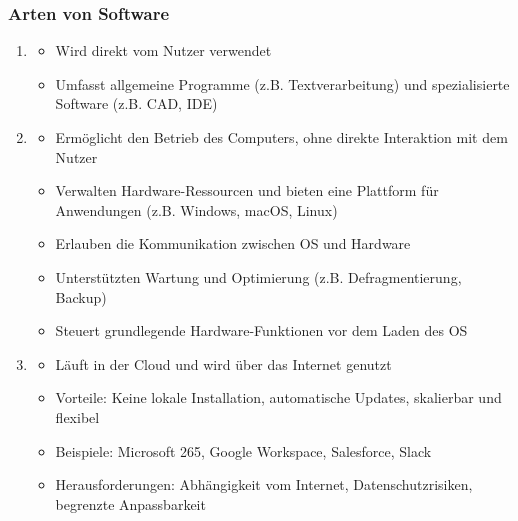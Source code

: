 \subsubsection{Arten von Software}
\begin{enumerate}
    \item {}
    \begin{itemize}
        \item Wird direkt vom Nutzer verwendet
        \item Umfasst allgemeine Programme (z.B. Textverarbeitung) und spezialisierte Software (z.B. CAD, IDE)
    \end{itemize}
    \item {}
    \begin{itemize}
        \item Ermöglicht den Betrieb des Computers, ohne direkte Interaktion mit dem Nutzer
        \item {} Verwalten Hardware-Ressourcen und bieten eine Plattform für Anwendungen (z.B. Windows, macOS, Linux)
        \item {} Erlauben die Kommunikation zwischen OS und Hardware
        \item {} Unterstützten Wartung und Optimierung (z.B. Defragmentierung, Backup)
        \item {} Steuert grundlegende Hardware-Funktionen vor dem Laden des OS
    \end{itemize}
    \item {} 
    \begin{itemize}
        \item Läuft in der Cloud und wird über das Internet genutzt
        \item Vorteile: Keine lokale Installation, automatische Updates, skalierbar und flexibel
        \item Beispiele: Microsoft 265, Google Workspace, Salesforce, Slack
        \item Herausforderungen: Abhängigkeit vom Internet, Datenschutzrisiken, begrenzte Anpassbarkeit
    \end{itemize}
\end{enumerate}
